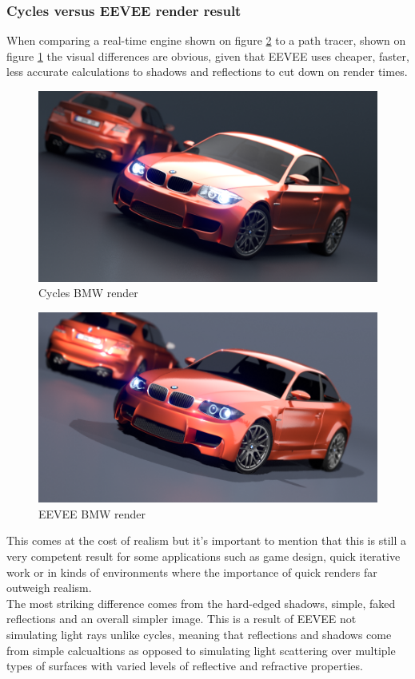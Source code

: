\documentclass[conference]{IEEEtran}
\begin{document}
\subsubsection{Cycles versus EEVEE render result}
    When comparing a real-time engine shown on figure \ref{fig:eeveeBMWvse} to a path tracer, shown on figure \ref{fig:cyclesBMWvse} the visual differences are obvious, given that EEVEE uses cheaper, faster, less accurate calculations to shadows and reflections to cut down on render times.
    \begin{figure}[htbp]
        \centering
        \includegraphics[scale=0.2]{Images/BMWcycles.png}
        \caption{Cycles BMW render}
        \label{fig:cyclesBMWvse}
    \end{figure}
    \begin{figure}[htbp]
        \centering
        \includegraphics[scale=0.2]{Images/BMWeevee.png}
        \caption{EEVEE BMW render}
        \label{fig:eeveeBMWvse}
    \end{figure}
    This comes at the cost of realism but it's important to mention that this is still a very competent result for some applications such as game design, quick iterative work or in kinds of environments where the importance of quick renders far outweigh realism.\\
    The most striking difference comes from the hard-edged shadows, simple, faked reflections and an overall simpler image. This is a result of EEVEE not simulating light rays unlike cycles, meaning that reflections and shadows come from simple calcualtions as opposed to simulating light scattering over multiple types of surfaces with varied levels of reflective and refractive properties.
\\
\end{document}
